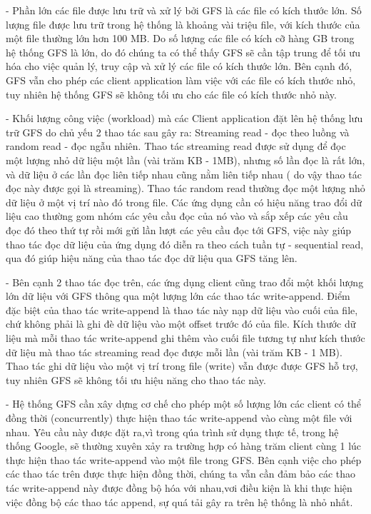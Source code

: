 \documentclass[a4paper, 10pt, conference]{IEEEconf}
\begin{document}
- Phần lớn các file được lưu trữ và xử lý bởi GFS là các file có kích thước lớn. Số lượng file được lưu trữ trong hệ thống là khoảng vài triệu file, với kích thước của một file thường lớn hơn 100 MB. Do số lượng các file có kích cỡ hàng GB trong hệ thống GFS là lớn, do đó chúng ta có thể thấy GFS sẽ cần tập trung để tối ưu hóa cho việc quản lý, truy cập và xử lý các file có kích thước lớn. Bên cạnh đó, GFS vẫn cho phép các client application làm việc với các file có kích thước nhỏ, tuy nhiên hệ thống GFS sẽ không tối ưu cho các file có kích thước nhỏ này.

- Khối lượng công việc (workload) mà các Client application đặt lên hệ thống lưu trữ GFS do chủ yếu 2 thao tác sau gây ra: Streaming read - đọc theo luồng và random read - đọc ngẫu nhiên. Thao tác streaming read được sử dụng để đọc một lượng nhỏ dữ liệu một lần (vài trăm KB - 1MB), nhưng số lần đọc là rất lớn, và dữ liệu ở các lần đọc liên tiếp nhau cũng nằm liên tiếp nhau ( do vậy thao tác đọc này được gọi là streaming). Thao tác random read thường đọc một lượng nhỏ dữ liệu ở một vị trí nào đó trong file. Các ứng dụng cần có hiệu năng trao đổi dữ liệu cao thường gom nhóm các yêu cầu đọc của nó vào và sắp xếp các yêu cầu đọc đó theo thứ tự rồi mới gửi lần lượt các yêu cầu đọc tới GFS, việc này giúp thao tác đọc dữ liệu của ứng dụng đó diễn ra theo cách tuần tự - sequential read, qua đó giúp hiệu năng của thao tác đọc dữ liệu qua GFS tăng lên.

- Bên cạnh 2 thao tác đọc trên, các ứng dụng client cũng trao đổi một khối lượng lớn dữ liệu với GFS thông qua một lượng lớn các thao tác write-append. Điểm đặc biệt của thao tác write-append là thao tác này nạp dữ liệu vào cuối của file, chứ không phải là ghi đè dữ liệu vào một offset trước đó của file. Kích thước dữ liệu mà mỗi thao tác write-append ghi thêm vào cuối file tương tự như kích thước dữ liệu mà thao tác streaming read đọc được mỗi lần (vài trăm KB - 1 MB). Thao tác ghi dữ liệu vào một vị trí trong file (write) vẫn được được GFS hỗ trợ, tuy nhiên GFS sẽ không tối ưu hiệu năng cho thao tác này.

- Hệ thống GFS cần xây dựng cơ chế cho phép một số lượng lớn các client có thể đồng thời (concurrently) thực hiện thao tác write-append vào cùng một file với nhau. Yêu cầu này được đặt ra,vì trong qúa trình sử dụng thực tế, trong hệ thống Google, sẽ thường xuyên xảy ra trường hợp có hàng trăm client cùng 1 lúc thực hiện thao tác write-append vào một file trong GFS. Bên cạnh việc cho phép các thao tác trên được thực hiện đồng thời, chúng ta vẫn cần đảm bảo các thao tác write-append này được đồng bộ hóa với nhau,vơi điều kiện là khi thực hiện việc đồng bộ các thao tác append, sự quá tải gây ra trên hệ thống là nhỏ nhất.
\end{document}
